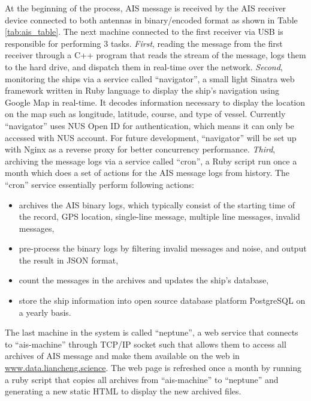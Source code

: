 At the beginning of the process, AIS message is received by the AIS receiver device connected to both antennas in binary/encoded format as shown in Table \ref{tab:ais_table}. The next machine connected to the first receiver via USB is responsible for performing 3 tasks. \textit{First}, reading the message from the first receiver through a C++ program that reads the stream of the message, logs them to the hard drive, and dispatch them in real-time over the network. \textit{Second}, monitoring the ships via a service called ``navigator'', a small light Sinatra web framework written in Ruby language to display the ship's navigation using Google Map in real-time. It decodes information necessary to display the location on the map such as longitude, latitude, course, and type of vessel. Currently ``navigator'' uses NUS Open ID for authentication, which means it can only be accessed with NUS account. For future development, ``navigator'' will be set up with Nginx as a reverse proxy for better concurrency performance. \textit{Third}, archiving the message logs via a service called ``cron'', a Ruby script run once a month which does a set of actions for the AIS message logs from history. The ``cron'' service essentially perform following actions: 
\begin{itemize}
    \item archives the AIS binary logs, which typically consist of the starting time of the record, GPS location, single-line message, multiple line messages, invalid messages,
    \item pre-process the binary logs by filtering invalid messages and noise, and output the result in JSON format,
    \item count the messages in the archives and updates the ship's database,
    \item store the ship information into open source database platform PostgreSQL on a yearly basis.
\end{itemize}
The last machine in the system is called ``neptune'', a web service that connects to ``ais-machine'' through TCP/IP socket such that allows them to access all archives of AIS message and make them available on the web in \url{www.data.liancheng.science}. The web page is refreshed once a month by running a ruby script that copies all archives from ``ais-machine'' to ``neptune'' and generating a new static HTML to display the new archived files. 

